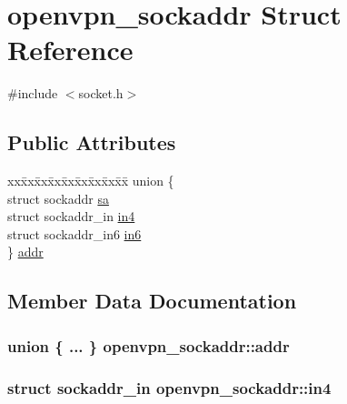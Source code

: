 \hypertarget{structopenvpn__sockaddr}{}\section{openvpn\+\_\+sockaddr Struct Reference}
\label{structopenvpn__sockaddr}


{\ttfamily \#include $<$socket.\+h$>$}

\subsection*{Public Attributes}
\begin{DoxyCompactItemize}
\item 
\begin{tabbing}
xx\=xx\=xx\=xx\=xx\=xx\=xx\=xx\=xx\=\kill
union \{\\
\>struct sockaddr \hyperlink{structopenvpn__sockaddr_abc5254db5ef7e60854146a476054abe1}{sa}\\
\>struct sockaddr\_in \hyperlink{structopenvpn__sockaddr_ae8fa2e6454c8c93b86eda19abca112b3}{in4}\\
\>struct sockaddr\_in6 \hyperlink{structopenvpn__sockaddr_afcdd41c2aad5907c7041ffdb59ed46aa}{in6}\\
\} \hyperlink{structopenvpn__sockaddr_a12146dbe55e6827888052e670f18a470}{addr}\\

\end{tabbing}\end{DoxyCompactItemize}


\subsection{Member Data Documentation}
\hypertarget{structopenvpn__sockaddr_a12146dbe55e6827888052e670f18a470}{}
\subsubsection[{addr}]{\setlength{\rightskip}{0pt plus 5cm}union \{ ... \}   openvpn\+\_\+sockaddr\+::addr}\label{structopenvpn__sockaddr_a12146dbe55e6827888052e670f18a470}
\hypertarget{structopenvpn__sockaddr_ae8fa2e6454c8c93b86eda19abca112b3}{}
\subsubsection[{in4}]{\setlength{\rightskip}{0pt plus 5cm}struct sockaddr\+\_\+in openvpn\+\_\+sockaddr\+::in4}\label{structopenvpn__sockaddr_ae8fa2e6454c8c93b86eda19abca112b3}
\hypertarget{structopenvpn__sockaddr_afcdd41c2aad5907c7041ffdb59ed46aa}{}

